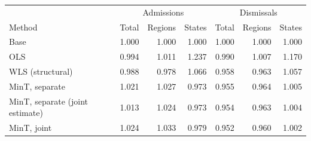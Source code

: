 \centering\small
\begin{tabular}{lrrrrrr}
\hline
 & \multicolumn{3}{c}{Admissions} & \multicolumn{3}{c}{Dismissals} \\
Method & Total & Regions & States & Total & Regions & States \\
\hline
Base & 1.000 & 1.000 & 1.000 & 1.000 & 1.000 & 1.000 \\
OLS & 0.994 & 1.011 & 1.237 & 0.990 & 1.007 & 1.170 \\
WLS (structural) & 0.988 & 0.978 & 1.066 & 0.958 & 0.963 & 1.057 \\
MinT, separate & 1.021 & 1.027 & 0.973 & 0.955 & 0.964 & 1.005 \\
MinT, separate (joint estimate) & 1.013 & 1.024 & 0.973 & 0.954 & 0.963 & 1.004 \\
MinT, joint & 1.024 & 1.033 & 0.979 & 0.952 & 0.960 & 1.002 \\
\hline
\end{tabular}
